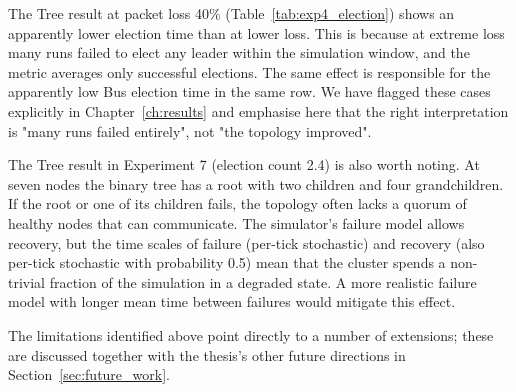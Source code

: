 The Tree result at packet loss 40\% (Table~\ref{tab:exp4_election}) shows an apparently lower election time than at lower loss. This is because at extreme loss many runs failed to elect any leader within the simulation window, and the metric averages only successful elections. The same effect is responsible for the apparently low Bus election time in the same row. We have flagged these cases explicitly in Chapter~\ref{ch:results} and emphasise here that the right interpretation is "many runs failed entirely", not "the topology improved".

The Tree result in Experiment 7 (election count 2.4) is also worth noting. At seven nodes the binary tree has a root with two children and four grandchildren. If the root or one of its children fails, the topology often lacks a quorum of healthy nodes that can communicate. The simulator's failure model allows recovery, but the time scales of failure (per-tick stochastic) and recovery (also per-tick stochastic with probability 0.5) mean that the cluster spends a non-trivial fraction of the simulation in a degraded state. A more realistic failure model with longer mean time between failures would mitigate this effect.

The limitations identified above point directly to a number of extensions; these are discussed together with the thesis's other future directions in Section~\ref{sec:future_work}.


